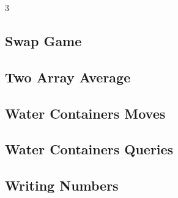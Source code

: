 \documentclass[8pt]{extarticle}
\begin{document}
\begin{multicols*}{3}
\subsection{Swap Game}
\begin{caixaenunciado}

\end{caixaenunciado}
\vspace{0.3cm}


\subsection{Two Array Average}
\begin{caixaenunciado}

\end{caixaenunciado}
\vspace{0.3cm}


\subsection{Water Containers Moves}
\begin{caixaenunciado}

\end{caixaenunciado}
\vspace{0.3cm}


\subsection{Water Containers Queries}
\begin{caixaenunciado}

\end{caixaenunciado}
\vspace{0.3cm}


\subsection{Writing Numbers}
\begin{caixaenunciado}

\end{caixaenunciado}
\vspace{0.3cm}

\end{multicols*}
\end{document}
